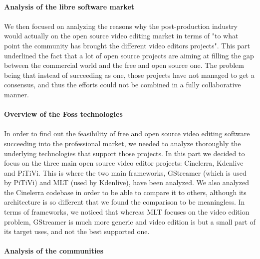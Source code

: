 \paragraph{Analysis of the libre software market}

\paragraph{}

We then focused on analyzing the reasons why the post-production industry
would actually %
on the open source video editing market in terms of "to what point
the community has brought the different video editors projects". This
part underlined the fact that a lot of open source projects are aiming
at filling the gap between the commercial world and the free and open
source one. The problem being that instead of succeeding as one, those
projects have not managed to get a consensus, and thus the efforts could
not be combined in a fully collaborative manner.

\paragraph{Overview of the Foss technologies}

\paragraph{}

In order to find out the feasibility of free and open source video editing
software succeeding into the professional market, we needed to analyze
thoroughly the underlying technologies that support those projects.
In this part we decided to focus on the three main open source video
editor projects: Cinelerra, Kdenlive and PiTiVi.  This is where the two
main frameworks, GStreamer (which is used by PiTiVi) and MLT (used by
Kdenlive), have been analyzed. We also analyzed the Cinelerra codebase
in order to be able to compare it to others, although its architecture
is so different that we found the comparison to be meaningless. In terms
of frameworks, we noticed that whereas MLT focuses on the video edition
problem, GStreamer is much more generic and video edition is but a small
part of its target uses, and not the best supported one.

\paragraph{Analysis of the communities}

